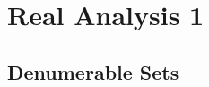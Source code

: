 \part{Real Analysis 1}\label{part:real-analysis-1}

\chapter{Denumerable Sets}\label{chp:denumerable-sets}


